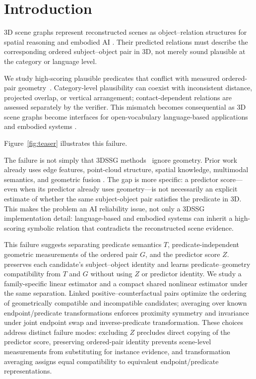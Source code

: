 \section{Introduction}

3D scene graphs represent reconstructed scenes as object--relation structures
for spatial reasoning and embodied AI
\cite{armeni20193dscenegraph,wald2020learning3dssg,sarkar2023sgaligner,liu2026viewongraph}.
Their predicted relations must describe the corresponding ordered
subject--object pair in 3D, not merely sound plausible at the category or
language level.

We study high-scoring plausible predicates that conflict with measured
ordered-pair geometry~\cite{nguyen2026relwitness,neau2026commonsense}.
Category-level plausibility can coexist with inconsistent distance, projected
overlap, or vertical arrangement; contact-dependent relations are assessed
separately by the verifier. This mismatch
becomes consequential as 3D scene graphs become
interfaces for open-vocabulary language-based applications and embodied systems
\cite{koch2024open3dsg,hou2025fross,zhang2025openfungraph,wang2025octreegraph,saxena2025zing3d,yu2025openworld3dsg,madhavaram2026vizor}.

\ifdefined\withteaser
Figure~\ref{fig:teaser} illustrates this failure.


\fi

The failure is not simply that 3DSSG methods~\cite{wald2020learning3dssg}
ignore geometry. Prior
work already uses edge features, point-cloud structure, spatial knowledge,
multimodal semantics, and geometric fusion
\cite{zhang2021sggpoint,feng2023smka,wang2023vlsat,koch2024sgrec3d,chen2024ccl3dsgg}.
The gap is more specific: a predictor score---even when its predictor
already uses geometry---is not necessarily an explicit estimate of whether the
same subject-object pair satisfies the predicate in 3D. This makes the
problem an AI reliability issue, not only a 3DSSG implementation detail:
language-based and embodied systems can inherit a high-scoring symbolic relation
that contradicts the reconstructed scene evidence.

This failure suggests separating predicate semantics $T$, predicate-independent
geometric measurements of the ordered pair $G$, and the predictor score $Z$.
\method{}
preserves each candidate's subject--object identity and learns
predicate--geometry compatibility from $T$ and $G$ without using $Z$ or
predictor identity. We study a family-specific linear estimator and a compact
shared nonlinear estimator under the same separation. Linked
positive--counterfactual pairs optimize the ordering of geometrically
compatible and incompatible candidates;
averaging over known endpoint/predicate transformations enforces proximity
symmetry and invariance under joint endpoint swap and inverse-predicate
transformation.
These choices address distinct failure modes: excluding $Z$ precludes direct
copying of the predictor score, preserving ordered-pair identity prevents
scene-level measurements from substituting for instance evidence, and
transformation averaging assigns equal compatibility to equivalent
endpoint/predicate representations.

